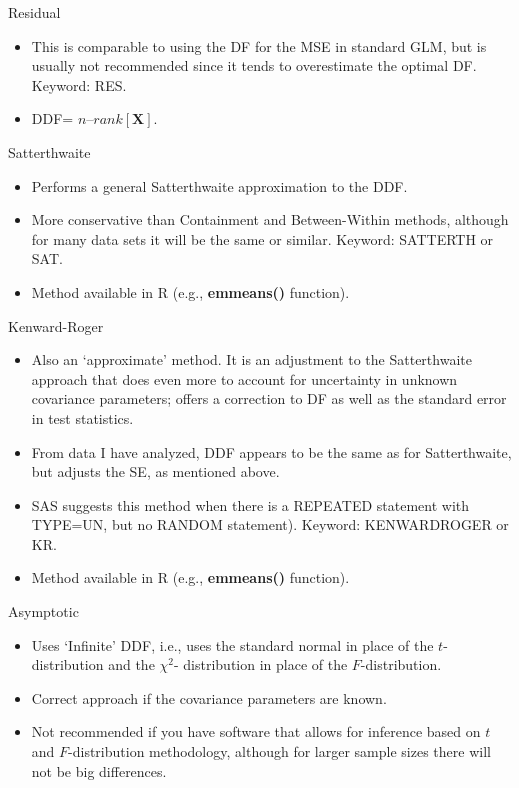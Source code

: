 \documentclass[
  9pt,
  ignorenonframetext,
]{beamer}
\begin{document}
\begin{frame}{Residual}
\protect\hypertarget{residual}{}
\begin{itemize}
\item
  This is comparable to using the DF for the MSE in standard GLM, but is
  usually not recommended since it tends to overestimate the optimal DF.
  Keyword: RES.
\item
  DDF= \(n–rank[\pmb X]\).
\end{itemize}
\end{frame}

\begin{frame}{Satterthwaite}
\protect\hypertarget{satterthwaite}{}
\begin{itemize}
\item
  Performs a general Satterthwaite approximation to the DDF.
\item
  More conservative than Containment and Between-Within methods,
  although for many data sets it will be the same or similar. Keyword:
  SATTERTH or SAT.
\item
  Method available in R (e.g., \textbf{emmeans()} function).
\end{itemize}
\end{frame}

\begin{frame}{Kenward-Roger}
\protect\hypertarget{kenward-roger}{}
\begin{itemize}
\item
  Also an `approximate' method. It is an adjustment to the Satterthwaite
  approach that does even more to account for uncertainty in unknown
  covariance parameters; offers a correction to DF as well as the
  standard error in test statistics.
\item
  From data I have analyzed, DDF appears to be the same as for
  Satterthwaite, but adjusts the SE, as mentioned above.
\item
  SAS suggests this method when there is a REPEATED statement with
  TYPE=UN, but no RANDOM statement). Keyword: KENWARDROGER or KR.
\item
  Method available in R (e.g., \textbf{emmeans()} function).
\end{itemize}
\end{frame}

\begin{frame}{Asymptotic}
\protect\hypertarget{asymptotic}{}
\begin{itemize}
\item
  Uses `Infinite' DDF, i.e., uses the standard normal in place of the
  \(t\)-distribution and the \(\chi^2\)- distribution in place of the
  \(F\)-distribution.
\item
  Correct approach if the covariance parameters are known.
\item
  Not recommended if you have software that allows for inference based
  on \(t\) and \(F\)-distribution methodology, although for larger
  sample sizes there will not be big differences.
\end{itemize}
\end{frame}
\end{document}
